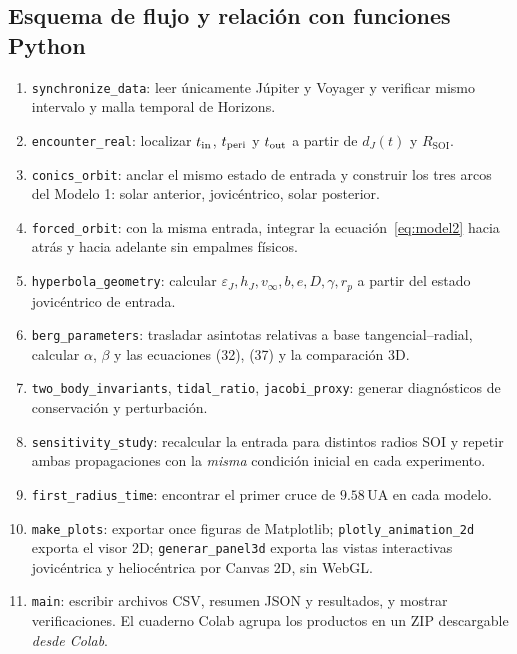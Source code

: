 \documentclass[11pt,a4paper]{article}
\newcommand{\SOI}{R_{\mathrm{SOI}}}
\begin{document}
\subsection{Esquema de flujo y relación con funciones Python}
\begin{enumerate}
\item \texttt{synchronize\_data}: leer únicamente Júpiter y Voyager y verificar mismo intervalo y malla temporal de Horizons.
\item \texttt{encounter\_real}: localizar $t_{\rm in}$, $t_{\rm peri}$ y $t_{\rm out}$ a partir de $d_J(t)$ y $\SOI$.
\item \texttt{conics\_orbit}: anclar el mismo estado de entrada y construir los tres arcos del Modelo 1: solar anterior, jovicéntrico, solar posterior.
\item \texttt{forced\_orbit}: con la misma entrada, integrar la ecuación~\eqref{eq:model2} hacia atrás y hacia adelante sin empalmes físicos.
\item \texttt{hyperbola\_geometry}: calcular $\varepsilon_J,h_J,v_\infty,b,e,D,\gamma,r_p$ a partir del estado jovicéntrico de entrada.
\item \texttt{berg\_parameters}: trasladar asintotas relativas a base tangencial--radial, calcular $\alpha$, $\beta$ y las ecuaciones (32), (37) y la comparación 3D.
\item \texttt{two\_body\_invariants}, \texttt{tidal\_ratio}, \texttt{jacobi\_proxy}: generar diagnósticos de conservación y perturbación.
\item \texttt{sensitivity\_study}: recalcular la entrada para distintos radios SOI y repetir ambas propagaciones con la \emph{misma} condición inicial en cada experimento.
\item \texttt{first\_radius\_time}: encontrar el primer cruce de $9.58\,\mathrm{UA}$ en cada modelo.
\item \texttt{make\_plots}: exportar once figuras de Matplotlib; \texttt{plotly\_animation\_2d} exporta el visor 2D; \texttt{generar\_panel3d} exporta las vistas interactivas jovicéntrica y heliocéntrica por Canvas 2D, sin WebGL.
\item \texttt{main}: escribir archivos CSV, resumen JSON y resultados, y mostrar verificaciones. El cuaderno Colab agrupa los productos en un ZIP descargable \emph{desde Colab}.
\end{enumerate}
\end{document}
